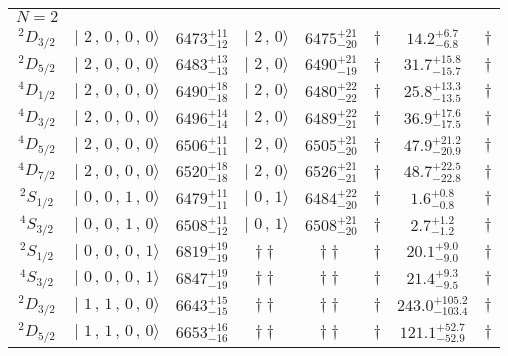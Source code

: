 \begin{tabular}{c| c c c c c c c}
\hline
 $N=2$  &  &  &  &  &  \\ 
$^{2}D_{3/2}$ & $\vert \,\,2\,,\,0\,,\,0\,,\,0 \rangle $ & $6473^{+11}_{-12}$ & $\vert \,\,2\,,\,0 \rangle$ & $6475^{+21}_{-20}$ & $\dagger$ & $14.2^{+6.7}_{-6.8}$ & $\dagger$ \\ 
$^{2}D_{5/2}$ & $\vert \,\,2\,,\,0\,,\,0\,,\,0 \rangle $ & $6483^{+13}_{-13}$ & $\vert \,\,2\,,\,0 \rangle$ & $6490^{+21}_{-19}$ & $\dagger$ & $31.7^{+15.8}_{-15.7}$ & $\dagger$ \\ 
$^{4}D_{1/2}$ & $\vert \,\,2\,,\,0\,,\,0\,,\,0 \rangle $ & $6490^{+18}_{-18}$ & $\vert \,\,2\,,\,0 \rangle$ & $6480^{+22}_{-22}$ & $\dagger$ & $25.8^{+13.3}_{-13.5}$ & $\dagger$ \\ 
$^{4}D_{3/2}$ & $\vert \,\,2\,,\,0\,,\,0\,,\,0 \rangle $ & $6496^{+14}_{-14}$ & $\vert \,\,2\,,\,0 \rangle$ & $6489^{+22}_{-21}$ & $\dagger$ & $36.9^{+17.6}_{-17.5}$ & $\dagger$ \\ 
$^{4}D_{5/2}$ & $\vert \,\,2\,,\,0\,,\,0\,,\,0 \rangle $ & $6506^{+11}_{-11}$ & $\vert \,\,2\,,\,0 \rangle$ & $6505^{+21}_{-20}$ & $\dagger$ & $47.9^{+21.2}_{-20.9}$ & $\dagger$ \\ 
$^{4}D_{7/2}$ & $\vert \,\,2\,,\,0\,,\,0\,,\,0 \rangle $ & $6520^{+18}_{-18}$ & $\vert \,\,2\,,\,0 \rangle$ & $6526^{+21}_{-21}$ & $\dagger$ & $48.7^{+22.5}_{-22.8}$ & $\dagger$ \\ 
$^{2}S_{1/2}$ & $\vert \,\,0\,,\,0\,,\,1\,,\,0 \rangle $ & $6479^{+11}_{-11}$ & $\vert \,\,0\,,\,1 \rangle$ & $6484^{+22}_{-20}$ & $\dagger$ & $1.6^{+0.8}_{-0.8}$ & $\dagger$ \\ 
$^{4}S_{3/2}$ & $\vert \,\,0\,,\,0\,,\,1\,,\,0 \rangle $ & $6508^{+11}_{-12}$ & $\vert \,\,0\,,\,1 \rangle$ & $6508^{+21}_{-20}$ & $\dagger$ & $2.7^{+1.2}_{-1.2}$ & $\dagger$ \\ 
$^{2}S_{1/2}$ & $\vert \,\,0\,,\,0\,,\,0\,,\,1 \rangle $ & $6819^{+19}_{-19}$ & $\dagger\dagger$ & $\dagger\dagger$ & $\dagger$ & $20.1^{+9.0}_{-9.0}$ & $\dagger$ \\ 
$^{4}S_{3/2}$ & $\vert \,\,0\,,\,0\,,\,0\,,\,1 \rangle $ & $6847^{+19}_{-19}$ & $\dagger\dagger$ & $\dagger\dagger$ & $\dagger$ & $21.4^{+9.3}_{-9.5}$ & $\dagger$ \\ 
$^{2}D_{3/2}$ & $\vert \,\,1\,,\,1\,,\,0\,,\,0 \rangle $ & $6643^{+15}_{-15}$ & $\dagger\dagger$ & $\dagger\dagger$ & $\dagger$ & $243.0^{+105.2}_{-103.4}$ & $\dagger$ \\ 
$^{2}D_{5/2}$ & $\vert \,\,1\,,\,1\,,\,0\,,\,0 \rangle $ & $6653^{+16}_{-16}$ & $\dagger\dagger$ & $\dagger\dagger$ & $\dagger$ & $121.1^{+52.7}_{-52.9}$ & $\dagger$ \\ 

\end{tabular}
